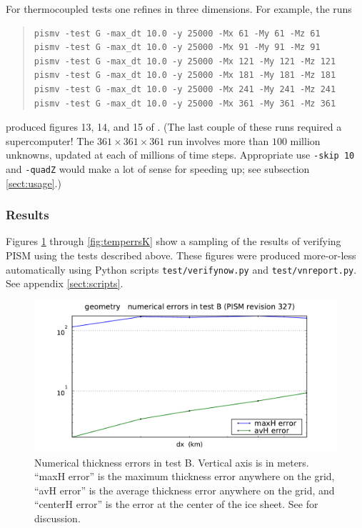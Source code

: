 \documentclass[11pt,final]{amsart}
\begin{document}
For thermocoupled tests one refines in three dimensions.  For example, the runs
\begin{quote}\small\begin{verbatim}
pismv -test G -max_dt 10.0 -y 25000 -Mx 61 -My 61 -Mz 61
pismv -test G -max_dt 10.0 -y 25000 -Mx 91 -My 91 -Mz 91
pismv -test G -max_dt 10.0 -y 25000 -Mx 121 -My 121 -Mz 121
pismv -test G -max_dt 10.0 -y 25000 -Mx 181 -My 181 -Mz 181
pismv -test G -max_dt 10.0 -y 25000 -Mx 241 -My 241 -Mz 241
pismv -test G -max_dt 10.0 -y 25000 -Mx 361 -My 361 -Mz 361
\end{verbatim}
\normalsize\end{quote}
produced figures 13, 14, and 15 of \cite{BBL}.  (The last couple of these runs required a supercomputer!  The $361\times 361\times 361$ run involves more than $100$ million unknowns, updated at each of millions of time steps.  Appropriate use \verb|-skip 10| and \verb|-quadZ| would make a lot of sense for speeding up; see subsection \ref{sect:usage}.)

\subsubsection*{Results}  Figures \ref{fig:thickerrsB} through \ref{fig:temperrsK} show a sampling of the results of verifying PISM using the tests described above.  These figures were produced more-or-less automatically using Python scripts \verb|test/verifynow.py| and \verb|test/vnreport.py|.  See appendix \ref{sect:scripts}.

\begin{figure}[ht]
\includegraphics[width=4.8in,keepaspectratio=true]{figs/thickerrs_B}
\caption{Numerical thickness errors in test B.  Vertical axis is in meters. ``maxH error'' is the maximum thickness error anywhere on the grid, ``avH error'' is the average thickness error anywhere on the grid, and ``centerH error'' is the error at the center of the ice sheet.  See \cite{BLKCB} for discussion.}
\label{fig:thickerrsB}
\end{figure}
\end{document}
